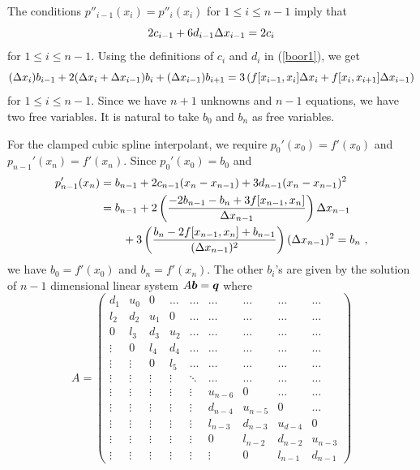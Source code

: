 The conditions $p''_{i-1}(x_i)= p''_i(x_i)$ for $1\leq i \leq n-1$
imply that
\[
2c_{i-1} + 6d_{i-1} \Delta{x_{i-1}} = 2 c_i
\]
for $1\leq i \leq n-1$.  Using the definitions of $c_i$ and $d_i$ in 
(\ref{boor1}), we get
\[
(\Delta{x_i}) b_{i-1}  + 2 (\Delta{x_i} + \Delta{x_{i-1}}) b_i
+ (\Delta{x_{i-1}}) b_{i+1} 
= 3 \left( f[x_{i-1},x_i] \Delta{x_i} + f[x_i,x_{i+1}] \Delta{x_{i-1}}
\right)
\]
for $1 \leq i \leq n-1$.  Since we have $n+1$ unknowns and $n-1$
equations, we have two free variables.  It is natural to take
$b_0$ and $b_n$ as free variables.

For the clamped cubic spline interpolant, we require
$p_0'(x_0) = f'(x_0)$ and $p_{n-1}'(x_n) = f'(x_n)$.  Since
$p_0'(x_0) = b_0$ and
\begin{align*}
p_{n-1}'(x_n) &= b_{n-1} + 2 c_{n-1} (x_n - x_{n-1})
+ 3 d_{n-1} ( x_n - x_{n-1})^2 \\
& = b_{n-1} +2
\left(\frac{-2b_{n-1} - b_n + 3f[x_{n-1},x_n]}{\Delta{x_{n-1}}}\right) 
\Delta{x_{n-1}} \\
&\qquad
+ 3 \left(\frac{b_n - 2 f[x_{n-1},x_n] + b_{n-1}}{(\Delta{x_{n-1}})^2}\right)
(\Delta{x_{n-1}})^2  = b_n \ ,
\end{align*}
we have $b_0 = f'(x_0)$ and $b_n = f'(x_n)$.  The
other $b_i$'s are given by the solution of $n-1$ dimensional linear system
$A \bm{b} = \bm{q}$ where
\[
A = \left( \begin{array}{ccccccccc}
d_1  & u_0 & 0 & \ldots & \ldots & \ldots & \ldots & \ldots & \ldots \\ 
l_2 & d_2  & u_1 & 0 & \ldots & \ldots & \ldots & \ldots & \ldots \\ 
0 & l_3 & d_3 & u_2 & \ldots & \ldots & \ldots & \ldots & \ldots \\ 
\vdots & 0 & l_4 & d_4 & \ldots & \ldots & \ldots & \ldots & \ldots \\ 
\vdots & \vdots & 0 & l_5 & \ldots & \ldots & \ldots & \ldots & \ldots \\ 
\vdots & \vdots & \vdots & \vdots & \ddots & \ldots & \ldots &
\ldots & \ldots \\ 
\vdots & \vdots & \vdots & \vdots & \vdots & u_{n-6} & 0 & \ldots & \ldots \\ 
\vdots & \vdots & \vdots & \vdots & \vdots & d_{n-4} &  u_{n-5} & 0 & \ldots \\ 
\vdots & \vdots & \vdots & \vdots & \vdots & l_{n-3} &  d_{n-3} & u_{d-4} & 0 \\ 
\vdots & \vdots & \vdots & \vdots & \vdots & 0 & l_{n-2} & d_{n-2} & u_{n-3} \\
\vdots & \vdots & \vdots & \vdots & \vdots & \vdots & 0 & l_{n-1} & d_{n-1} 
\end{array} \right)
\]
